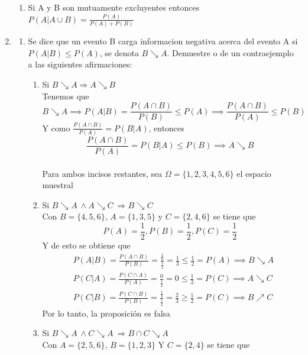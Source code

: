 \documentclass[12pt,a4paper]{report}
\begin{document}
\begin{enumerate}
{\begin{enumerate}[label=\alph*) ]
	\item{Si A y B son mutuamente excluyentes entonces $P(A|A \cup B)=\frac{P(A)}{P(A)+P(B)}$}



\end{enumerate}

	}


   \item {

	\begin{enumerate}[label=\alph*) ]
   \item {
	Se dice que un evento B carga informacion negativa acerca del evento A si $P(A|B) \leq P(A)$, se denota  $B \searrow A$. Demuestre o de un contraejemplo a las siguientes afirmaciones:
		\begin{enumerate}
		\item{
			Si $B \searrow A \Rightarrow A \searrow B$ \\
			Tenemos que
			\[B \searrow A \implies P(A|B) = \frac{P(A \cap B)}{P(B)} \leq P(A) \implies \frac{P(A \cap B)}{P(A)} \leq P(B)\]
			Y como $\frac{P(A \cap B)}{P(A)} = P(B|A)$, entonces
			\[\frac{P(A \cap B)}{P(A)} = P(B|A) \leq P(B) \implies A \searrow B\]
		}\\
		Para ambos incisos restantes, sea $\Omega = \{1,2, 3, 4, 5, 6\}$ el espacio muestral
		\item{
			Si $B \searrow A \ \wedge A \searrow C \ \Rightarrow B \searrow C$\\
			Con $B = \{4, 5, 6\}$, $A = \{1, 3, 5\}$ y $C = \{2, 4, 6\}$ se tiene que
			\[P(A) = \frac{1}{2}, P(B) = \frac{1}{2}, P(C) = \frac{1}{2}\]
			Y de esto se obtiene que
			\begin{align*}
				&P(A|B) = \frac{P(A \cap B)}{P(B)} = \frac{\frac{1}{6}}{\frac{1}{2}}
				= \frac{1}{3} \leq \frac{1}{2} = P(A) \implies B \searrow A\\
				&P(C|A) = \frac{P(C \cap A)}{P(A)} = \frac{0}{\frac{1}{2}}
				= 0 \leq \frac{1}{2} = P(C) \implies A \searrow C\\
				&P(C|B) = \frac{P(C \cap B)}{P(B)} = \frac{\frac{1}{3}}{\frac{1}{2}}
				= \frac{2}{3} \geq \frac{1}{2} = P(C) \implies B \nearrow C
			\end{align*}
			Por lo tanto, la proposición es falsa
			}\\
		\item{
			Si $B \searrow A \ \wedge C \searrow A \ \Rightarrow B\cap C \searrow A$\\
			Con $A = \{2, 5, 6\}$, $B = \{1, 2, 3\}$ Y $C = \{2, 4\}$ se tiene que
}
\end{enumerate}}
\end{enumerate}}
\end{enumerate}
\end{document}
